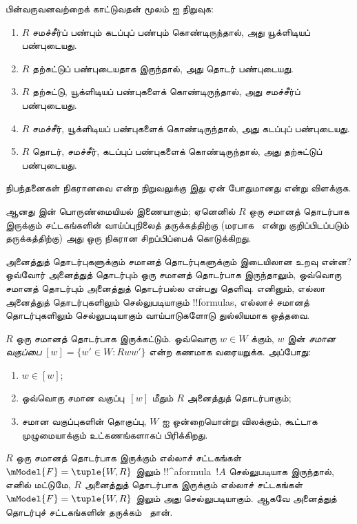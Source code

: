\documentclass[../../../include/open-logic-section]{subfiles}
\begin{document}
\begin{prob}
  பின்வருவனவற்றைக் காட்டுவதன் மூலம்
   ஐ நிறுவுக:
  \begin{enumerate}
  \item $R$ சமச்சீர்ப் பண்பும் கடப்புப் பண்பும் கொண்டிருந்தால், அது
    யூக்ளிடியப் பண்புடையது.
  \item $R$ தற்சுட்டுப் பண்புடையதாக இருந்தால், அது தொடர் பண்புடையது.
  \item $R$ தற்சுட்டு, யூக்ளிடியப் பண்புகளைக் கொண்டிருந்தால், அது
    சமச்சீர்ப் பண்புடையது.
  \item $R$ சமச்சீர், யூக்ளிடியப் பண்புகளைக் கொண்டிருந்தால், அது
    கடப்புப் பண்புடையது.
  \item $R$ தொடர், சமச்சீர், கடப்புப் பண்புகளைக் கொண்டிருந்தால், அது
    தற்சுட்டுப் பண்புடையது.
  \end{enumerate}
  நிபந்தனைகள் நிகரானவை என்ற நிறுவலுக்கு இது ஏன் போதுமானது என்று விளக்குக.
\end{prob}

 ஆனது  இன் பொருண்மையியல்
இணையாகும்; ஏனெனில் $R$ ஒரு சமானத் தொடர்பாக இருக்கும் சட்டகங்களின்
வாய்ப்புநிலைத் தருக்கத்திற்கு (மரபாக~ என்று குறிப்பிடப்படும்
தருக்கத்திற்கு) அது ஒரு நிகரான சிறப்பிப்பைக் கொடுக்கிறது.

அனைத்துத் தொடர்புகளுக்கும் சமானத் தொடர்புகளுக்கும் இடையிலான உறவு என்ன?
ஒவ்வோர் அனைத்துத் தொடர்பும் ஒரு சமானத் தொடர்பாக இருந்தாலும், ஒவ்வொரு
சமானத் தொடர்பும் அனைத்துத் தொடர்பல்ல என்பது தெளிவு. எனினும், எல்லா
அனைத்துத் தொடர்புகளிலும் செல்லுபடியாகும் !!{formula}s, எல்லாச் சமானத்
தொடர்புகளிலும் செல்லுபடியாகும் வாய்பாடுகளோடு துல்லியமாக ஒத்தவை.

\begin{prop}
  $R$ ஒரு சமானத் தொடர்பாக இருக்கட்டும். ஒவ்வொரு $w \in W$ க்கும்,
  $w$ இன் \emph{சமான வகுப்பை} $[w] = \{w'\in W : Rww'\}$ என்ற கணமாக
  வரையறுக்க. அப்போது:
  \begin{enumerate}
  \item $w \in [w]$;
  \item ஒவ்வொரு சமான வகுப்பு~$[w]$ மீதும் $R$ அனைத்துத் தொடர்பாகும்;
  \item சமான வகுப்புகளின் தொகுப்பு, $W$ ஐ ஒன்றையொன்று விலக்கும், கூட்டாக
    முழுமையாக்கும் உட்கணங்களாகப் பிரிக்கிறது.
  \end{enumerate}
\end{prop}

\begin{prop}
  $R$ ஒரு சமானத் தொடர்பாக இருக்கும் எல்லாச் சட்டகங்கள் $\mModel{F}
  =\tuple{W,R}$ இலும் !!^a{formula}~$!A$ செல்லுபடியாக இருந்தால், எனில்
  மட்டுமே, $R$ அனைத்துத் தொடர்பாக இருக்கும் எல்லாச் சட்டகங்கள்
  $\mModel{F} =\tuple{W,R}$ இலும் அது செல்லுபடியாகும். ஆகவே அனைத்துத்
  தொடர்புச் சட்டகங்களின் தருக்கம்~ தான்.
\end{prop}
\end{document}
